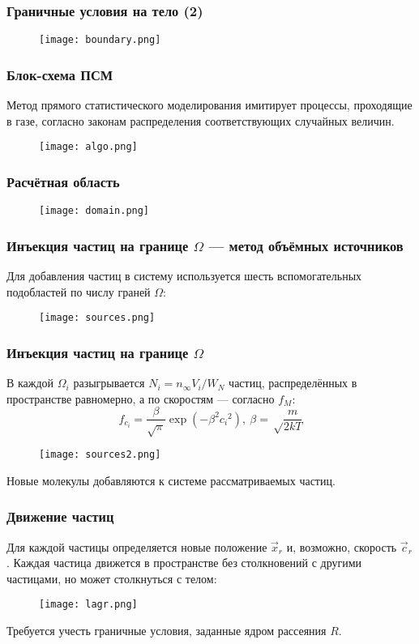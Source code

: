 \documentclass[onlymath]{beamer}
\newcommand\dom{\Omega}
\newcommand\flowcon{n_{\infty}}
\begin{document}
\begin{frame}
  \frametitle{Граничные условия на тело (2)}
  \begin{figure}[!h]
    \centering
    \texttt{[image: boundary.png]}
  \end{figure}
\end{frame}

\begin{frame}
  \frametitle{Блок-схема ПСМ}
  Метод прямого статистического моделирования имитирует процессы,
  проходящие в газе, согласно законам распределения соответствующих
  случайных величин.
  \begin{figure}[!h]
    \centering
    \texttt{[image: algo.png]}
  \end{figure}  
\end{frame}

\begin{frame}
  \frametitle{Расчётная область}
  \begin{figure}[!h]
    \centering
    \texttt{[image: domain.png]}
  \end{figure}   
\end{frame}

\begin{frame}
  \frametitle{Инъекция частиц на границе $\dom$ — метод объёмных
    источников}
  Для добавления частиц в систему используется шесть вспомогательных
  подобластей по числу граней $\dom$:
  \begin{figure}[!h]
    \centering
    \texttt{[image: sources.png]}
  \end{figure}    
\end{frame}

\begin{frame}
  \frametitle{Инъекция частиц на границе $\dom$}
  В каждой $\dom_i$ разыгрывается $N_i = \flowcon V_i / W_N$ частиц,
  распределённых в пространстве равномерно, а по скоростям — согласно
  $f_M$:
 \begin{equation*}
    f_{c_i} = \frac{\beta}{\sqrt{\pi}}\exp(-\beta^2{c_i}^2),\:  \beta = \sqrt\frac{m}{2kT}
  \end{equation*}
  \begin{figure}[!h]
    \centering
    \texttt{[image: sources2.png]}
  \end{figure}    
  Новые молекулы добавляются к системе рассматриваемых частиц.
\end{frame}

\begin{frame}
  \frametitle{Движение частиц}
  Для каждой частицы определяется новые положение $\vec{x}_r$ и,
  возможно, скорость $\vec{c}_r$. Каждая частица движется в
  пространстве без столкновений с другими частицами, но может
  столкнуться с телом:
  \begin{figure}[!h]
    \centering
    \texttt{[image: lagr.png]}
  \end{figure}
  Требуется учесть граничные условия, заданные ядром рассеяния $R$.
\end{frame}
\end{document}
